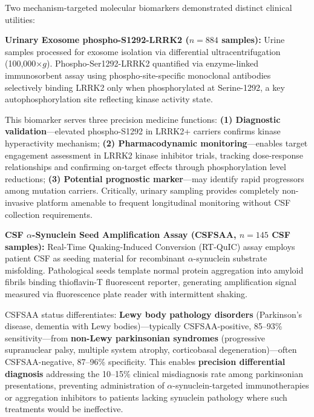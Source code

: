 \documentclass[11pt]{article}
\begin{document}
Two mechanism-targeted molecular biomarkers demonstrated distinct clinical utilities:

\textbf{Urinary Exosome phospho-S1292-LRRK2 ($n=884$ samples):} Urine samples processed for exosome isolation via differential ultracentrifugation (100,000$\times g$). Phospho-Ser1292-LRRK2 quantified via enzyme-linked immunosorbent assay using phospho-site-specific monoclonal antibodies selectively binding LRRK2 only when phosphorylated at Serine-1292, a key autophosphorylation site reflecting kinase activity state\cite{fraser2016ser}. 

This biomarker serves three precision medicine functions: \textbf{(1) Diagnostic validation}—elevated phospho-S1292 in LRRK2+ carriers confirms kinase hyperactivity mechanism; \textbf{(2) Pharmacodynamic monitoring}—enables target engagement assessment in LRRK2 kinase inhibitor trials\cite{simuni2024lrrk2}, tracking dose-response relationships and confirming on-target effects through phosphorylation level reductions; \textbf{(3) Potential prognostic marker}—may identify rapid progressors among mutation carriers. Critically, urinary sampling provides completely non-invasive platform amenable to frequent longitudinal monitoring without CSF collection requirements.

\textbf{CSF $\alpha$-Synuclein Seed Amplification Assay (CSFSAA, $n=145$ CSF samples):} Real-Time Quaking-Induced Conversion (RT-QuIC) assay\cite{concha2024alpha} employs patient CSF as seeding material for recombinant $\alpha$-synuclein substrate misfolding. Pathological seeds template normal protein aggregation into amyloid fibrils binding thioflavin-T fluorescent reporter, generating amplification signal measured via fluorescence plate reader with intermittent shaking. 

CSFSAA status differentiates: \textbf{Lewy body pathology disorders} (Parkinson's disease, dementia with Lewy bodies)—typically CSFSAA-positive, 85--93\% sensitivity\cite{siderowf2023csf}—from \textbf{non-Lewy parkinsonian syndromes} (progressive supranuclear palsy, multiple system atrophy, corticobasal degeneration)—often CSFSAA-negative, 87--96\% specificity\cite{siderowf2023csf,concha2024alpha}. This enables \textbf{precision differential diagnosis} addressing the 10--15\% clinical misdiagnosis rate among parkinsonian presentations\cite{hughes2001accuracy}, preventing administration of $\alpha$-synuclein-targeted immunotherapies or aggregation inhibitors to patients lacking synuclein pathology where such treatments would be ineffective.
\end{document}
